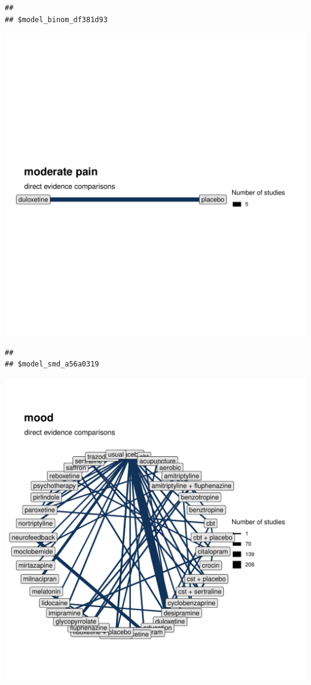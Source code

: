 \documentclass{article}\usepackage[]{graphicx}\usepackage[]{color}
\makeatletter
\newenvironment{kframe}{%
 \def\at@end@of@kframe{}%
 \ifinner\ifhmode%
  \def\at@end@of@kframe{\end{minipage}}%
  \begin{minipage}{\columnwidth}%
 \fi\fi%
 \def\FrameCommand##1{\hskip\@totalleftmargin \hskip-\fboxsep
 \colorbox{shadecolor}{##1}\hskip-\fboxsep
     \hskip-\linewidth \hskip-\@totalleftmargin \hskip\columnwidth}%
 \MakeFramed {\advance\hsize-\width
   \@totalleftmargin\z@ \linewidth\hsize
   \@setminipage}}%
 {\par\unskip\endMakeFramed%
 \at@end@of@kframe}
\newenvironment{knitrout}{}{} %
\makeatother
\begin{document}
\begin{knitrout}
\begin{kframe}\begin{verbatim}
## 
## $model_binom_df381d93
\end{verbatim}
\end{kframe}
\includegraphics[width=\textwidth]{figure/networks-2} 
\begin{kframe}\begin{verbatim}
## 
## $model_smd_a56a0319
\end{verbatim}
\end{kframe}
\includegraphics[width=\textwidth]{figure/networks-3} 

\end{knitrout}
\end{document}
